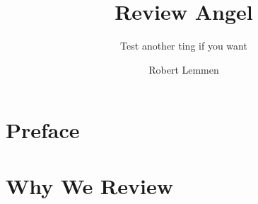\documentclass[11pt,twoside]{article}
\title{Review Angel}
\subtitle{Test another ting if you want}
\author{Robert Lemmen}
\begin{document}
\begin{titlepage}
\begin{center}
{\huge\bf\thetitle}
\theposttitle
\end{center}
\end{titlepage}
\thispagestyle{empty}
\clearpage
\tableofcontents
\clearpage
\section{Preface}
\section{Why We Review}
\lipsum
\lipsum
\lipsum
\lipsum

\layout
\clearpage
\layout
\end{document}
